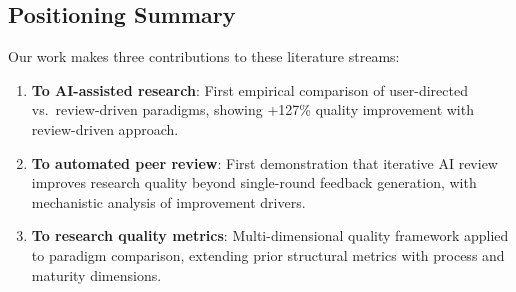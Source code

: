 \subsection{Positioning Summary}

Our work makes three contributions to these literature streams:

\begin{enumerate}[leftmargin=*]
\item \textbf{To AI-assisted research}: First empirical comparison of user-directed vs.\ review-driven paradigms, showing +127\% quality improvement with review-driven approach.

\item \textbf{To automated peer review}: First demonstration that iterative AI review improves research quality beyond single-round feedback generation, with mechanistic analysis of improvement drivers.

\item \textbf{To research quality metrics}: Multi-dimensional quality framework applied to paradigm comparison, extending prior structural metrics with process and maturity dimensions.
\end{enumerate}
